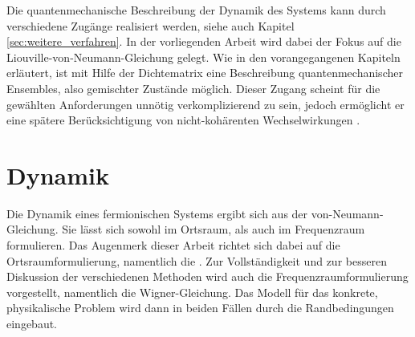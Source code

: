 Die quantenmechanische Beschreibung der Dynamik des Systems kann durch verschiedene Zugänge realisiert werden, siehe auch Kapitel \ref{sec:weitere_verfahren}. In der vorliegenden Arbeit wird dabei der Fokus auf die Liouville-von-Neumann-Gleichung gelegt. Wie in den vorangegangenen Kapiteln erläutert, ist mit Hilfe der Dichtematrix eine Beschreibung quantenmechanischer Ensembles, also gemischter Zustände möglich. Dieser Zugang scheint für die gewählten Anforderungen unnötig verkomplizierend zu sein, jedoch ermöglicht er eine spätere Berücksichtigung von nicht-kohärenten Wechselwirkungen \cite{wiedenhaus}.


\section{Dynamik}
Die Dynamik eines fermionischen Systems ergibt sich aus der von-Neumann-Gleichung. Sie lässt sich sowohl im Ortsraum, als auch im Frequenzraum formulieren. Das Augenmerk dieser Arbeit richtet sich dabei auf die Ortsraumformulierung, namentlich die \lvn. Zur Vollständigkeit und zur besseren Diskussion der verschiedenen Methoden wird auch die Frequenzraumformulierung vorgestellt, namentlich die Wigner-Gleichung. Das Modell für das konkrete, physikalische Problem wird dann in beiden Fällen durch die Randbedingungen eingebaut.

